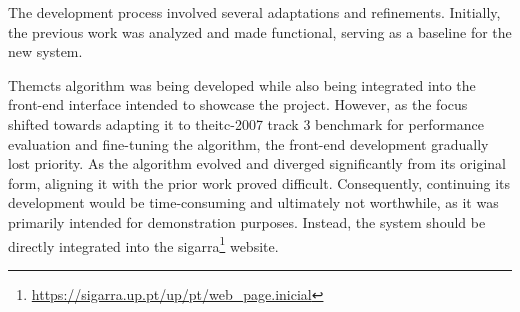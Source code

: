 The development process involved several adaptations and refinements. Initially, the previous work was analyzed and made functional, serving as a baseline for the new system. 

The\ac{mcts} algorithm was being developed while also being integrated into the front-end interface intended to showcase the project. However, as the focus shifted towards adapting it to the\ac{itc-2007} track 3 benchmark for performance evaluation and fine-tuning the algorithm, the front-end development gradually lost priority. As the algorithm evolved and diverged significantly from its original form, aligning it with the prior work proved difficult. Consequently, continuing its development would be time-consuming and ultimately not worthwhile, as it was primarily intended for demonstration purposes. Instead, the system should be directly integrated into the sigarra\footnote{\url{https://sigarra.up.pt/up/pt/web\_page.inicial}} website.



